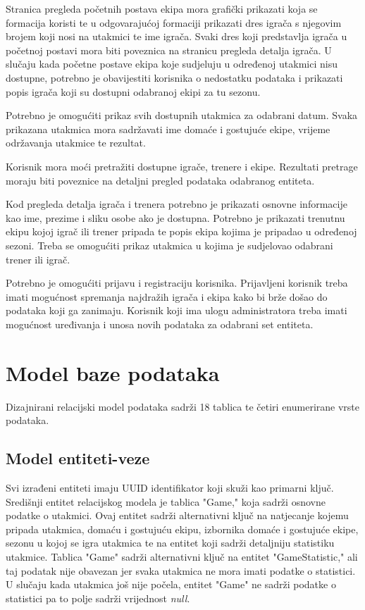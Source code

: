 \documentclass[times, utf8, zavrsni]{fer}
\begin{document}
Stranica pregleda početnih postava ekipa mora grafički prikazati koja se formacija koristi te u odgovarajućoj formaciji prikazati dres igrača s njegovim brojem koji nosi na utakmici te ime igrača.
Svaki dres koji predstavlja igrača u početnoj postavi mora biti poveznica na stranicu pregleda detalja igrača.
U slučaju kada početne postave ekipa koje sudjeluju u određenoj utakmici nisu dostupne, potrebno je obavijestiti korisnika o nedostatku podataka i prikazati popis igrača koji su dostupni odabranoj ekipi za tu sezonu.

Potrebno je omogućiti prikaz svih dostupnih utakmica za odabrani datum. Svaka prikazana utakmica mora sadržavati ime domaće i gostujuće ekipe, vrijeme održavanja utakmice te rezultat.

Korisnik mora moći pretražiti dostupne igrače, trenere i ekipe. Rezultati pretrage moraju biti poveznice na detaljni pregled podataka odabranog entiteta.

Kod pregleda detalja igrača i trenera potrebno je prikazati osnovne informacije kao ime, prezime i sliku osobe ako je dostupna.
Potrebno je prikazati trenutnu ekipu kojoj igrač ili trener pripada te popis ekipa kojima je pripadao u određenoj sezoni.
Treba se omogućiti prikaz utakmica u kojima je sudjelovao odabrani trener ili igrač.

Potrebno je omogućiti prijavu i registraciju korisnika. Prijavljeni korisnik treba imati mogućnost spremanja najdražih igrača i ekipa kako bi brže došao do podataka koji ga zanimaju.
Korisnik koji ima ulogu administratora treba imati mogućnost uređivanja i unosa novih podataka za odabrani set entiteta.

\chapter{Model baze podataka}

Dizajnirani relacijski model podataka sadrži 18 tablica te četiri enumerirane vrste podataka.

\section{Model entiteti-veze}

Svi izrađeni entiteti imaju UUID identifikator koji skuži kao primarni ključ.
Središnji entitet relacijskog modela je tablica "Game," koja sadrži osnovne podatke o utakmici.
Ovaj entitet sadrži alternativni ključ na natjecanje kojemu pripada utakmica, domaću i gostujuću ekipu, izbornika domaće i gostujuće ekipe,
sezonu u kojoj se igra utakmica te na entitet koji sadrži detaljniju statistiku utakmice.
Tablica "Game" sadrži alternativni ključ na entitet "GameStatistic," ali taj podatak nije obavezan jer svaka utakmica ne mora imati podatke o statistici.
U slučaju kada utakmica još nije počela, entitet "Game" ne sadrži podatke o statistici pa to polje sadrži vrijednost \emph{null}.
\end{document}
